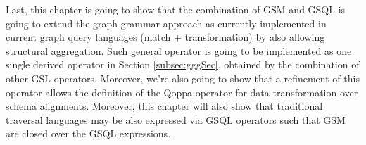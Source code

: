 
Last, this chapter is going to show that the combination of GSM and GSQL is going to extend the graph grammar approach as currently implemented in current graph query languages (match + transformation) by also allowing structural aggregation. Such general operator is going to be implemented as one single derived operator in Section \ref{subsec:gggSec}, obtained by the combination of other GSL operators. Moreover, we're also going to show that a refinement of this operator allows the definition of the Qoppa operator for data transformation over schema alignments.
Moreover, this chapter will also show that traditional traversal languages may be also  expressed via GSQL operators such that GSM are closed over the GSQL expressions. 
